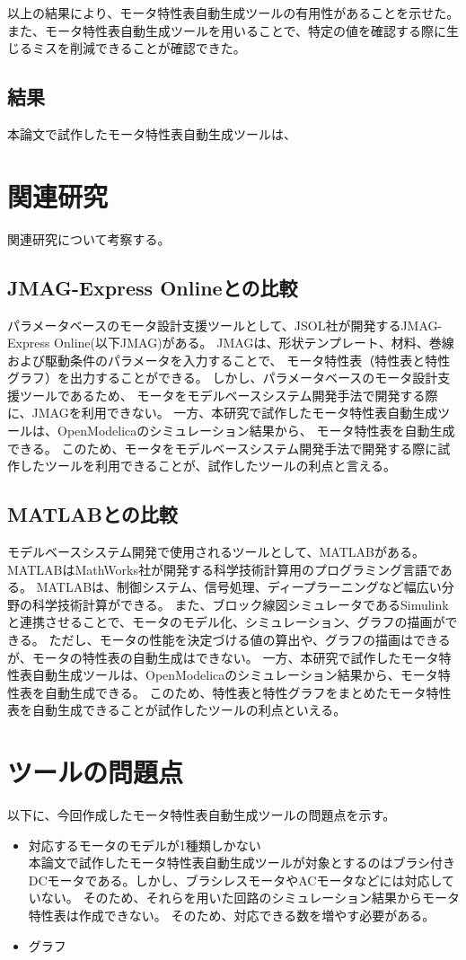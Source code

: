 以上の結果により、モータ特性表自動生成ツールの有用性があることを示せた。また、モータ特性表自動生成ツールを用いることで、特定の値を確認する際に生じるミスを削減できることが確認できた。


\subsection{結果}
本論文で試作したモータ特性表自動生成ツールは、

\section{関連研究}
関連研究について考察する。

\subsection{JMAG-Express Onlineとの比較}
パラメータベースのモータ設計支援ツールとして、JSOL社が開発するJMAG-Express Online(以下JMAG)がある\cite{jmag}。
JMAGは、形状テンプレート、材料、巻線および駆動条件のパラメータを入力することで、
モータ特性表（特性表と特性グラフ）を出力することができる。
しかし、パラメータベースのモータ設計支援ツールであるため、
モータをモデルベースシステム開発手法で開発する際に、JMAGを利用できない。
一方、本研究で試作したモータ特性表自動生成ツールは、OpenModelicaのシミュレーション結果から、
モータ特性表を自動生成できる。
このため、モータをモデルベースシステム開発手法で開発する際に試作したツールを利用できることが、試作したツールの利点と言える。

\subsection{MATLABとの比較}
モデルベースシステム開発で使用されるツールとして、MATLABがある。
MATLABはMathWorks社が開発する科学技術計算用のプログラミング言語である。
MATLABは、制御システム、信号処理、ディープラーニングなど幅広い分野の科学技術計算ができる。
また、ブロック線図シミュレータであるSimulinkと連携させることで、モータのモデル化、シミュレーション、グラフの描画ができる。
ただし、モータの性能を決定づける値の算出や、グラフの描画はできるが、モータの特性表の自動生成はできない。
一方、本研究で試作したモータ特性表自動生成ツールは、OpenModelicaのシミュレーション結果から、モータ特性表を自動生成できる。
このため、特性表と特性グラフをまとめたモータ特性表を自動生成できることが試作したツールの利点といえる。

\section{ツールの問題点}

以下に、今回作成したモータ特性表自動生成ツールの問題点を示す。

\begin{itemize}
	\item 対応するモータのモデルが1種類しかない\\
      本論文で試作したモータ特性表自動生成ツールが対象とするのはブラシ付きDCモータである。しかし、ブラシレスモータやACモータなどには対応していない。
      そのため、それらを用いた回路のシミュレーション結果からモータ特性表は作成できない。
		  そのため、対応できる数を増やす必要がある。
    
  \item グラフ
\end{itemize}







